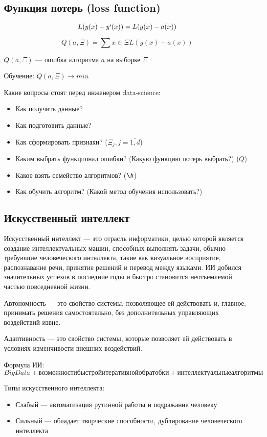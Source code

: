 \documentclass[14pt, a4paper]{article}
\begin{document}
    \subsection*{Функция потерь (loss function)}

    \[ L(y(x) - y`(x)) = L(y(x) - a(x)) \]

    \[ Q(a, \Xi) = \sum{x \in \Xi} L(y(x) - a(x)) \]

    $Q(a, \Xi)$ --- ошибка алгоритма $a$ на выборке $\Xi$

    Обучение: $Q(a, \Xi) \rightarrow min$

    Какие вопросы стоят перед инженером data-science:
    \begin{itemize}
        \item Как получить данные?
        \item Как подготовить данные?
        \item Как сформировать признаки? ($\Xi_j, j = \overline{1, d}$)
        \item Каким выбрать функционал ошибки? (Какую функцию потерь выбрать?) ($Q$)
        \item Какое взять семейство алгоритмов? ($\A$)
        \item Как обучить алгоритм? (Какой метод обучения использовать?)
    \end{itemize}

    
    \subsection*{Искусственный интеллект}
    
    Искусственный интеллект --- это отрасль информатики, целью которой является создание интеллектуальных машин, способных выполнять задачи, обычно требующие человеческого интеллекта, такие как визуальное восприятие, распознавание речи, принятие решений и перевод между языками. ИИ добился значительных успехов в последние годы и быстро становится неотъемлемой частью повседневной жизни.

    Автономность --- это свойство системы, позволяющее ей действовать и, главное, принимать решения самостоятельно, без дополнительных управляющих воздействий извне.

    Адаптивность --- это свойство системы, которые позволяет ей действовать в условиях изменчивости внешних воздействий.

    Формула ИИ: $BigData + возможности быстрой итеративной обратобки + интеллектуальные алгоритмы$

    Типы искусственного интеллекта:
    \begin{itemize}
        \item Слабый --- автоматизация рутинной работы и подражание человеку
        \item Сильный --- обладает творческие способности, дублирование человеческого интеллекта
    \end{itemize}
\end{document}
